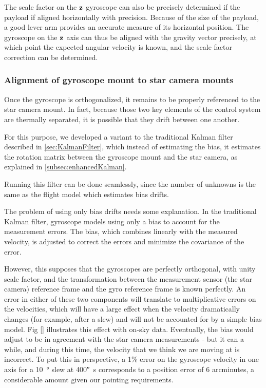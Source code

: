 The scale factor on the $\textrm{\textbf{z}}$ gyroscope can also be precisely determined if the payload if aligned horizontally with precision. Because of the size of the payload, a good lever arm provides an accurate measure of its horizontal position. The gyroscope on the $\textrm{\textbf{z}}$ axis can thus be aligned with the gravity vector precisely, at which point the expected angular velocity is known, and the scale factor correction can be determined.


\subsubsection{Alignment of gyroscope mount to star camera mounts}

Once the gyroscope is orthogonalized, it remains to be properly referenced to the star camera mount. In fact, because those two key elements of the control system are thermally separated, it is possible that they drift between one another. 

For this purpose, we developed a variant to the traditional Kalman filter described in \ref{sec:KalmanFilter}, which instead of estimating the bias, it estimates the rotation matrix between the gyroscope mount and the star camera, as explained in \ref{subsec:enhancedKalman}. 

Running this filter can be done seamlessly, since the number of unknowns is the same as the flight model which estimates bias drifts. 

The problem of using only bias drifts needs some explanation. In the traditional Kalman filter, gyroscope models using only a bias to account for the measurement errors. The bias, which combines linearly with the measured velocity, is adjusted to correct the errors and minimize the covariance of the error.

However, this supposes that the gyroscopes are perfectly orthogonal, with unity scale factor, and the transformation between the measurement sensor (the star camera) reference frame and the gyro reference frame is known perfectly. An error in either of these two components will translate to multiplicative errors on the velocities, which will have a large effect when the velocity dramatically changes (for example, after a slew) and will not be accounted for by a simple bias model. Fig [] illustrates this effect with on-sky data. Eventually, the bias would adjust to be in agreement with the star camera measurements - but it can a while, and during this time, the velocity that we think we are moving at is incorrect. To put this in perspective, a 1\% error on the gyroscope velocity in one axis for a \SI{10}{\degree} slew at \ang{;;400}\si{\per\second} corresponds to a position error of 6 arcminutes, a considerable amount given our pointing requirements.

